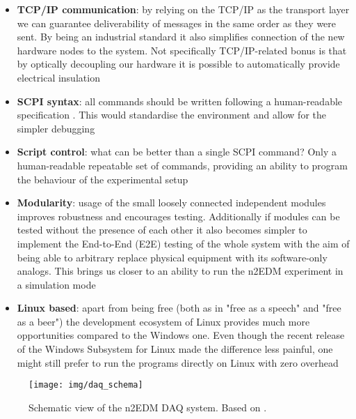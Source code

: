 \begin{itemize}
	\item \textbf{TCP/IP communication}: by relying on the TCP/IP as the transport layer we can guarantee deliverability of messages in the same order as they were sent. By being an industrial standard it also simplifies connection of the new hardware nodes to the system. Not specifically TCP/IP-related bonus is that by optically decoupling our hardware it is possible to automatically provide electrical insulation
	\item \textbf{SCPI syntax}: all commands should be written following a human-readable specification \cite{SCPIConsortium1999}. This would standardise the environment and allow for the simpler debugging
	\item \textbf{Script control}: what can be better than a single SCPI command? Only a human-readable repeatable set of commands, providing an ability to program the behaviour of the experimental setup
	\item \textbf{Modularity}: usage of the small loosely connected independent modules improves robustness and encourages testing. Additionally if modules can be tested without the presence of each other it also becomes simpler to implement the End-to-End (E2E) testing of the whole system with the aim of being able to arbitrary replace physical equipment with its software-only analogs. This brings us closer to an ability to run the n2EDM experiment in a simulation mode
	\item \textbf{Linux based}: apart from being free (both as in "free as a speech" and "free as a beer") the development ecosystem of Linux provides much more opportunities compared to the Windows one. Even though the recent release \cite{Loewen2019} of the Windows Subsystem for Linux made the difference less painful, one might still prefer to run the programs directly on Linux with zero overhead
\end{itemize}

\begin{figure}[h]
	\centering
	\texttt{[image: img/daq\_schema]}
	\caption{Schematic view of the n2EDM DAQ system. Based on \cite{Bison2018}.}
\end{figure}